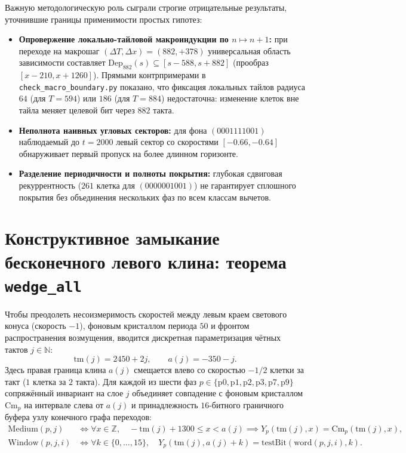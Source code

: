 \documentclass[11pt, a4paper]{article}
\begin{document}
Важную методологическую роль сыграли строгие отрицательные результаты, уточнившие границы применимости простых гипотез:
\begin{itemize}
    \item \textbf{Опровержение локально-тайловой макроиндукции по $n \mapsto n+1$:} при переходе на макрошаг $(\Delta T, \Delta x) = (882, +378)$ универсальная область зависимости составляет $\mathrm{Dep}_{882}(s) \subseteq [s - 588, s + 882]$ (прообраз $[x - 210, x + 1260]$). Прямыми контрпримерами в \texttt{check\_macro\_boundary.py} показано, что фиксация локальных тайлов радиуса $64$ (для $T=594$) или $186$ (для $T=884$) недостаточна: изменение клеток вне тайла меняет целевой бит через $882$ такта.
    \item \textbf{Неполнота наивных угловых секторов:} для фона $(0001111001)$ наблюдаемый до $t = 2000$ левый сектор со скоростями $[-0.66, -0.64]$ обнаруживает первый пропуск на более длинном горизонте.
    \item \textbf{Разделение периодичности и полноты покрытия:} глубокая сдвиговая рекуррентность ($261$ клетка для $(0000001001)$) не гарантирует сплошного покрытия без объединения нескольких фаз по всем классам вычетов.
\end{itemize}

\section{Конструктивное замыкание бесконечного левого клина: теорема \texttt{wedge\_all}}

Чтобы преодолеть несоизмеримость скоростей между левым краем светового конуса (скорость $-1$), фоновым кристаллом периода $50$ и фронтом распространения возмущения, вводится дискретная параметризация чётных тактов $j \in \mathbb{N}$:
\begin{equation}
\mathrm{tm}(j) = 2450 + 2j, \qquad a(j) = -350 - j.
\end{equation}
Здесь правая граница клина $a(j)$ смещается влево со скоростью $-1/2$ клетки за такт ($1$ клетка за $2$ такта). Для каждой из шести фаз $p \in \{\mathrm{p0}, \mathrm{p1}, \mathrm{p2}, \mathrm{p3}, \mathrm{p7}, \mathrm{p9}\}$ сопряжённый инвариант на слое $j$ объединяет совпадение с фоновым кристаллом $\mathrm{Cm}_p$ на интервале слева от $a(j)$ и принадлежность $16$-битного граничного буфера узлу конечного графа переходов:
\begin{align}
\mathrm{Medium}(p, j) &\iff \forall x \in \mathbb{Z},\quad -\mathrm{tm}(j) + 1300 \le x < a(j) \implies Y_p(\mathrm{tm}(j), x) = \mathrm{Cm}_p(\mathrm{tm}(j), x), \\
\mathrm{Window}(p, j, i) &\iff \forall k \in \{0, \dots, 15\},\quad Y_p(\mathrm{tm}(j), a(j) + k) = \mathrm{testBit}(\mathrm{word}(p, j, i), k).
\end{align}
\end{document}
